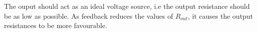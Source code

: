 \begin{enumerate}[label=\arabic*.,ref=\theenumi]
The ouput should act as an ideal voltage source, i.e the output resistance should be as low as possible. As feedback reduces the values of $R_{out}$, it causes the output resistances to be more favourable.

\end{enumerate}